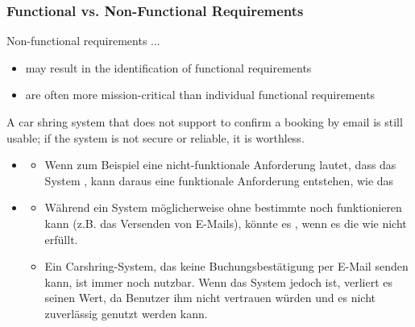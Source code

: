 \subsubsection{Functional vs. Non-Functional Requirements}
\begin{defBox}[title=Observations]
    Non-functional requirements ...
    \begin{itemize}
        \item may result in the identification of functional requirements
        \item are often more mission-critical than individual functional requirements
    \end{itemize}
\end{defBox}
\begin{defBox}[title=Example (Relative importance of non-functional requirements)]
    A car shring system that does not support to confirm a booking by email is still usable; if the system is not secure or reliable, it is worthless.
\end{defBox}
\begin{infoBox}[title=Beobachtungen zum Unterschied:]
    \begin{itemize}
        \item {}
        \begin{itemize}
            \item Wenn zum Beispiel eine nicht-funktionale Anforderung lautet, dass das System , kann daraus eine funktionale Anforderung entstehen, wie das 
            
        \end{itemize}
        \item {}
        \begin{itemize}
            \item Während ein System möglicherweise ohne bestimmte  noch funktionieren kann (z.B. das Versenden von E-Mails), könnte es , wenn es die  wie  nicht erfüllt.
            \item {} Ein Carshring-System, das keine Buchungsbestätigung per E-Mail senden kann, ist immer noch nutzbar. Wenn das System jedoch  ist, verliert es seinen Wert, da Benutzer ihm nicht vertrauen würden und es nicht zuverlässig genutzt werden kann.
        \end{itemize}
    \end{itemize}
\end{infoBox}

